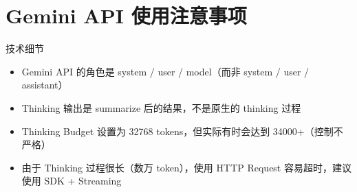 \section{Gemini API 使用注意事项}

\begin{knowledgebox}{技术细节}
\begin{itemize}
    \item Gemini API 的角色是 system / user / model（而非 system / user / assistant）
    \item Thinking 输出是 summarize 后的结果，不是原生的 thinking 过程
    \item Thinking Budget 设置为 32768 tokens，但实际有时会达到 34000+（控制不严格）
    \item 由于 Thinking 过程很长（数万 token），使用 HTTP Request 容易超时，建议使用 SDK + Streaming
\end{itemize}
\end{knowledgebox}

